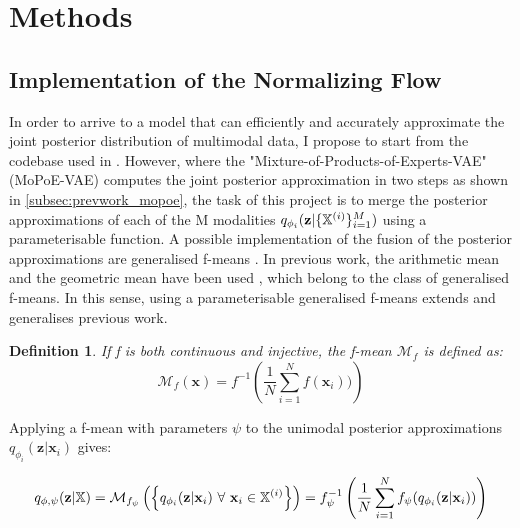 \documentclass[english]{scrartcl}
\newtheorem{definition}{Definition}
\begin{document}
    \section{Methods}

    \subsection{Implementation of the Normalizing Flow}
    In order to arrive to a model that can efficiently and accurately approximate the joint posterior distribution of multimodal data, I propose to start from the codebase used in \citet{sutter_generalized_2020}.
    However, where the "Mixture-of-Products-of-Experts-VAE" (MoPoE-VAE) computes the joint posterior approximation in two steps as shown in \cref{subsec:prevwork_mopoe}, the task of this project is to merge the posterior approximations of each of the M modalities $q_{\phi_i}(\textbf{z}|\{\mathbb{X}^{(i)}\}_{i=1}^M)$ using a parameterisable function.
    A possible implementation of the fusion of the posterior approximations are generalised f-means \citep{niculescu_convex_2018}.
    In previous work, the arithmetic mean and the geometric mean have been used  \citep[PoE,MoE,MoPoE]{wu_multimodal_2018,shi_variational_2019,sutter_generalized_2020}, which belong to the class of generalised f-means.
    In this sense, using a parameterisable generalised f-means extends and generalises previous work.
    \begin{definition}
        If f is both continuous and injective, the f-mean $\mathcal{M}_f$ is defined as:
        \begin{equation}
             \mathcal{M}_{f}\left( \textbf{x} \right) = f^{-1}\left( \frac{1}{N} \sum ^N _{i=1} f(\textbf{x}_i)) \right)
        \end{equation}
    \end{definition}

    Applying a f-mean with parameters $\psi$ to the unimodal posterior approximations $q_{\phi _i}(\textbf{z}|\textbf{x}_i)$ gives:

    \begin{equation}\label{eq:merge_function}
        q_{\phi, \psi}(\textbf{z} | \mathbb{X}) = \mathcal{M}_{f_{\psi}}\left( \left\{ q_{\phi _i}(\textbf{z}|\textbf{x}_i)\ \forall\ \textbf{x}_i \in \mathbb{X}^{(i)} \right\} \right) = f_{\psi}^{-1}\left( \frac{1}{N} \sum ^N _{i=1} f_{\psi}(q_{\phi _i}(\textbf{z}|\textbf{x}_i)) \right)
    \end{equation}
\end{document}
